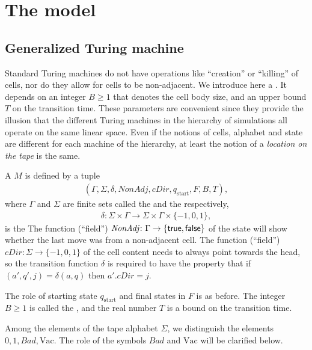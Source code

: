 \documentclass[12pt]{memoir}
\newcommand{\fld}[1]{\ensuremath{\textit{#1}}}
\def\B{B}
\newcommand{\Bad}{\mathit{Bad}}
\newcommand{\Tu}{T}
\newcommand{\cDir}{\fld{cDir}}
\newcommand{\NonAdj}{\fld{NonAdj}}
\newcommand{\start}{\mathrm{start}}
\newcommand{\Vacant}{\mathrm{Vac}}
\begin{document}
\section{The model}

\subsection{Generalized Turing machine}

Standard Turing machines do not have
operations like ``creation'' or ``killing'' of cells, nor
do they allow for cells to be non-adjacent.
We introduce here a .
It depends on an integer \( \B \ge 1 \) that denotes the cell body size,
and an upper bound \( \Tu \) on the transition time.
These parameters are convenient since they provide the illusion that the different Turing
machines in the hierarchy of simulations all operate on the same linear space.
Even if the notions of cells, alphabet
and state are different for each machine of the hierarchy, 
at least the notion of a \emph{location
on the tape} is the same.


\begin{definition}\label{def:gen-TM}
    A  \( M \) is defined by a tuple
        \begin{align}\label{eq:gen-TM}
             (\Gamma, \Sigma, \delta, \NonAdj, \cDir, q_{\start},F, \B, \Tu),
       \end{align}
    where \( \Gamma \) and \( \Sigma \) are finite sets
    called the  and the  respectively,
        \begin{align*}
             \delta: \Sigma\times \Gamma
             \to \Sigma\times \Gamma\times\{-1,0,1\},
        \end{align*}
    is the 
The function (``field'') \( \NonAdj\colon\Gamma\to\{\true,\false\} \) of the 
state will show whether the last move was from a non-adjacent cell.
The function (``field'') \( \cDir\colon\Sigma\to\{-1,0,1\} \) of the cell content
needs to always point towards the head, so 
the transition function \( \delta \) is required to have the property that
if \( (a',q',j)=\delta(a,q) \) then \( a'.\cDir=j \).

The role of starting state \( q_{\start} \) and final states in \( F \) is as before.
The integer \( \B\ge 1 \) is called the ,
and the real number \( \Tu \) is a bound on the transition time.

Among the elements of the tape alphabet \( \Sigma \), 
we distinguish the elements \( 0,1,\Bad,\Vacant \).
The role of the symbols \( \Bad \) and \( \Vacant \) will be clarified below.
\end{definition}
\end{document}
